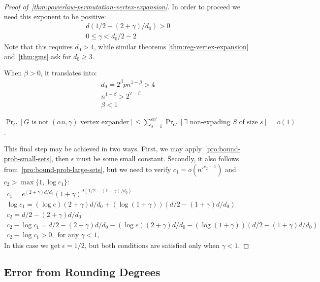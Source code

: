 \begin{proof}[Proof of~\autoref{thm:powerlaw-permutation-vertex-expansion}]
    In order to proceed we need this exponent to be positive:
    \begin{gather}
        d(1/2-(2+\gamma)/d_0)>0\\
        0\leq\gamma<d_0/2-2
    \end{gather}
    Note that this requires $d_0>4$, while similar theorems
    \ref{thm:reg-vertex-expansion} and~\ref{thm:gms} ask for $d_0\geq 3$.
    
    When $\beta>0$, it translates into:
    \begin{gather}
        d_0=2^\beta pn^{1-\beta}>4\\
        n^{1-\beta}>2^{2-\beta}\\
        \beta<1
    \end{gather}
    
    $\Pr_G[G\text{ is not }(\alpha n,\gamma)\text{ vertex expander}]
    \leq\sum_{s=1}^{\epsilon n'}{\Pr_G[\exists\text{ non-expading }S\text{ of size }s]}=o(1)$.
    
    This final step may be achieved in two ways.
    First, we may apply~\autoref{pro:bound-prob-small-sets},
    then $\epsilon$ must be some small constant.
    Secondly, it also follows from~\autoref{pro:bound-prob-large-sets}, but we
    need to verify $c_1=o\left(n'^{c_2-1}\right)$ and $c_2>\max\{1,\log c_1\}$:
    \begin{gather*}
        c_1=e^{(2+\gamma)d/d_0}(1+\gamma)^{d(1/2-(1+\gamma)/d_0)}\\
        \log c_1=(\log e)(2+\gamma)d/d_0+(\log(1+\gamma))(d/2-(1+\gamma)d/d_0)\\
        c_2=d/2-(2+\gamma)d/d_0\\
        c_2-\log c_1=
        d/2-(2+\gamma)d/d_0
        -(\log e)(2+\gamma)d/d_0
        -(\log(1+\gamma))(d/2-(1+\gamma)d/d_0)\\
        c_2-\log c_1>0,\text{ for any }\gamma<1,
    \end{gather*}
    In this case we get $\epsilon=1/2$, but both conditions
    are satisfied only when $\gamma<1$.
\end{proof}

\subsection{Error from Rounding Degrees}
\label{subsec:powerlaw-permutation-rounding-error}

